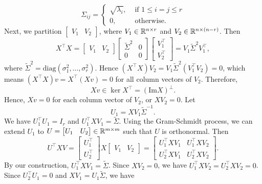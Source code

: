 \begin{enumerate}
        $$\Sigma_{ij} = \begin{cases}
            \sqrt{\lambda_i}, & \text{ if } 1\le i = j \le r \\
            0,                & \text{ otherwise.}
          \end{cases}$$
        Next, we partition $\begin{bmatrix}
            V_1 & V_2
          \end{bmatrix}$, where $V_1\in{\mathbb{R}}^{n\times r}$ and $V_2\in{\mathbb{R}}^{n\times(n-r)}$. Then
        $$X^\top X = \begin{bmatrix}
            V_1 & V_2
          \end{bmatrix}\begin{bmatrix}
            \tilde{\Sigma}^2 & 0 \\
            0                & 0
          \end{bmatrix} \begin{bmatrix}
            V_1^\top \\ V_2^\top
          \end{bmatrix} = V_1 \tilde{\Sigma}^2 V_1^\top,$$
        where $\tilde{\Sigma}^2 = \mathrm{diag}(\sigma_1^2,\ldots,\sigma_r^2)$. Hence $(X^\top X)V_2 = V_1 \tilde{\Sigma}^2(V_1^\top V_2) = 0$, which means $(X^\top X)v = X^\top(Xv) = 0$ for all column vectors of $V_2$. Therefore,
        $$Xv \in \ker X^\top = (\mathrm{Im} X)^\bot.$$
        Hence, $Xv = 0$ for each column vector of $V_2$, or $XV_2 = 0$. Let
        $$U_1 = XV_1\tilde{\Sigma}^{-1}.$$
        We have $U_1^\top U_1 = I_r$ and $U_1^\top X V_1 = \tilde{\Sigma}$. Using the Gram-Schmidt process, we can extend $U_1$ to $U = \begin{bmatrix}
            U_1 & U_2
          \end{bmatrix} \in {\mathbb{R}}^{m\times m}$ such that $U$ is orthonormal. Then
        $$U^\top XV = \begin{bmatrix}
            U_1^\top \\ U_2^\top
          \end{bmatrix}X\begin{bmatrix}
            V_1 & V_2
          \end{bmatrix} = \begin{bmatrix}
            U_1^\top XV_1 & U_1^\top XV_2 \\
            U_2^\top XV_1 & U_2^\top XV_2
          \end{bmatrix}.$$
        By our construction, $U_1^\top XV_1 = \tilde{\Sigma}$. Since $XV_2 = 0$, we have $U_1^\top XV_2 = U_2^\top XV_2 = 0$. Since $U_2^\top U_1 = 0$ and $XV_1 = U_1\tilde{\Sigma}$, we have

\end{enumerate}
